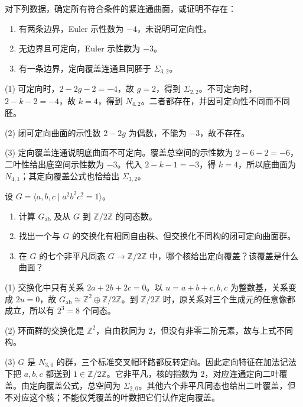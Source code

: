 \begin{exercise}\label{g1:ex:surface-invariant-recovery}
	对下列数据，确定所有符合条件的紧连通曲面，或证明不存在：
	\begin{enumerate}
		\item 有两条边界，Euler 示性数为 \(-4\)，未说明可定向性。
		\item 无边界且可定向，Euler 示性数为 \(-3\)。
		\item 有一条边界，定向覆盖连通且同胚于 \(\Sigma_{3,2}\)。
	\end{enumerate}
\end{exercise}
\begin{solution}
	(1) 可定向时，\(2-2g-2=-4\)，故 \(g=2\)，得到 \(\Sigma_{2,2}\)。不可定向时，\(2-k-2=-4\)，故 \(k=4\)，得到 \(N_{4,2}\)。二者都存在，并因可定向性不同而不同胚。

	(2) 闭可定向曲面的示性数 \(2-2g\) 为偶数，不能为 \(-3\)，故不存在。

	(3) 定向覆盖连通说明底曲面不可定向。覆盖总空间的示性数为 \(2-6-2=-6\)，二叶性给出底空间示性数为 \(-3\)。代入 \(2-k-1=-3\)，得 \(k=4\)，所以底曲面为 \(N_{4,1}\)；其定向覆盖公式也恰给出 \(\Sigma_{3,2}\)。
\end{solution}

\begin{exercise}\label{g1:ex:surface-abelianization-test}
	设 \(G=\langle a,b,c\mid a^2b^2c^2=1\rangle\)。
	\begin{enumerate}
		\item 计算 \(G_{\mathrm{ab}}\) 及从 \(G\) 到 \(\mathbb Z/2\mathbb Z\) 的同态数。
		\item 找出一个与 \(G\) 的交换化有相同自由秩、但交换化不同构的闭可定向曲面群。
		\item 在 \(G\) 的七个非平凡同态 \(G\rightarrow\mathbb Z/2\mathbb Z\) 中，哪个核给出定向覆盖？该覆盖是什么曲面？
	\end{enumerate}
\end{exercise}
\begin{solution}
	(1) 交换化中只有关系 \(2a+2b+2c=0\)。以 \(u=a+b+c,b,c\) 为整数基，关系变成 \(2u=0\)，故 \(G_{\mathrm{ab}}\cong\mathbb Z^2\oplus\mathbb Z/2\mathbb Z\)。到 \(\mathbb Z/2\mathbb Z\) 时，原关系对三个生成元的任意像都成立，所以有 \(2^3=8\) 个同态。

	(2) 环面群的交换化是 \(\mathbb Z^2\)，自由秩同为 \(2\)，但没有非零二阶元素，故与上式不同构。

	(3) \(G\) 是 \(N_{3,0}\) 的群，三个标准交叉帽环路都反转定向。因此定向特征在加法记法下把 \(a,b,c\) 都送到 \(1\in\mathbb Z/2\mathbb Z\)。它非平凡，核的指数为 \(2\)，对应连通定向二叶覆盖。由定向覆盖公式，总空间为 \(\Sigma_{2,0}\)。其他六个非平凡同态也给出二叶覆盖，但不对应这个核；不能仅凭覆盖的叶数把它们认作定向覆盖。
\end{solution}

